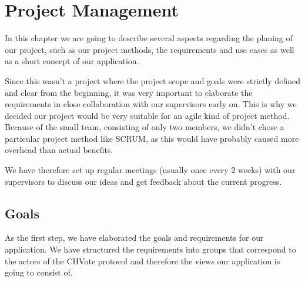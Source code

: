 
\newcommand{\zs}[0]{\cellcolor{zscol}}				%
\newcommand{\zi}[0]{\cellcolor{zicol}}				%
\newcommand{\ms}[1]{
	\makebox[.7cm][r]{
		\tikz[baseline=(char.base)]{
			\node[shape=circle,draw,inner sep=.02cm,fill=black,text=white] (char) { #1 };
		}
	}
}

\newcommand{\sq}[1]{\textcolor{#1}{\rule{.3cm}{.3cm}}}

\newcommand{\phase}[1]{
	\multicolumn{22}{l}{} \\
	\multicolumn{22}{l}{\cellcolor{gray!20}\textbf{#1}} \\ \hline
}

\chapter{Project Management}
In this chapter we are going to describe several aspects regarding the planing of our project, such as our project methods, the requirements and use cases as well as a short concept of our application. 

Since this wasn't a project where the project scope and goals were strictly defined and clear from the beginning, it was very important to elaborate the requirements in close collaboration with our supervisors early on. This is why we decided our project would be very suitable for an agile kind of project method. Because of the small team, consisting of only two members, we didn't chose a particular project method like SCRUM, as this would have probably caused more overhead than actual benefits.  

We have therefore set up regular meetings (usually once every 2 weeks) with our supervisors to discuss our ideas and get feedback about the current progress.

\section{Goals}
As the first step, we have elaborated the goals and requirements for our application. We have structured the requirements into groups that correspond to the actors of the CHVote protocol and therefore the views our application is going to consist of.

